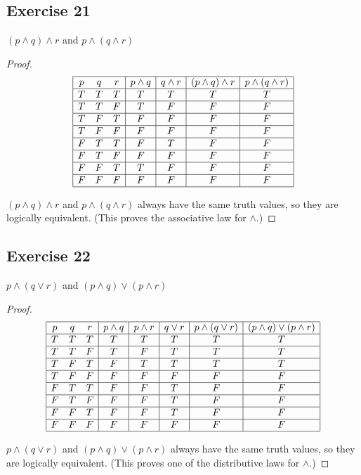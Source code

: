 \documentclass[14pt]{extarticle}
\begin{document}
\subsection{Exercise 21} 
$(p \wedge q) \wedge r$ and $p \wedge (q \wedge r)$

\begin{proof} 
$$ 
\begin{array}{|ccc|c|c|c|c|} 
\hline 
p & q & r & p \wedge q & q \wedge r & (p \wedge q) \wedge r & p \wedge (q \wedge r) \\ 
\hline 
T & T & T & T & T & T & T \\ 
\hline 
T & T & F & T & F & F & F \\ 
\hline 
T & F & T & F & F & F & F \\ 
\hline 
T & F & F & F & F & F & F \\ 
\hline 
F & T & T & F & T & F & F \\
\hline 
F & T & F & F & F & F & F \\ 
\hline 
F & F & T & T & F & F & F \\ 
\hline 
F & F & F & F & F & F & F \\ 
\hline 
\end{array} 
$$

$(p \wedge q) \wedge r$ and $p \wedge (q \wedge r)$ always have the same truth values, so they are logically equivalent. (This proves the associative law for $\wedge$.) 
\end{proof}

\subsection{Exercise 22} 
$p \wedge (q \vee r)$ and $(p \wedge q) \vee (p \wedge r)$

\begin{proof} 
$$ 
\begin{array}{|ccc|c|c|c|c|c|} 
\hline 
p & q & r & p \wedge q & p \wedge r & q \vee r & p \wedge (q \vee r) & (p \wedge q) \vee (p \wedge r) \\
\hline 
T & T & T & T & T & T & T & T \\ 
\hline 
T & T & F & T & F & T & T & T \\
\hline 
T & F & T & F & T & T & T & T \\ 
\hline 
T & F & F & F & F & F & F & F \\
\hline 
F & T & T & F & F & T & F & F \\ 
\hline 
F & T & F & F & F & T & F & F \\
\hline 
F & F & T & F & F & T & F & F \\ 
\hline 
F & F & F & F & F & F & F & F \\
\hline 
\end{array} 
$$

$p \wedge (q \vee r)$ and $(p \wedge q) \vee (p \wedge r)$ always have the same truth values, so they are logically equivalent. (This proves one of the distributive laws for $\wedge$.) 
\end{proof}
\end{document}

